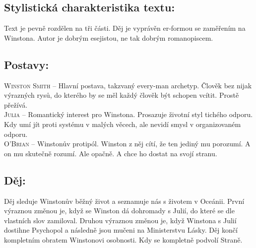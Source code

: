 \documentclass{extarticle} %
\begin{document}




\subsection*{Stylistická charakteristika textu:}
\noindent
Text je pevně rozdělen na tři části. Děj je vyprávěn er-formou se zaměřením na Winstona. Autor je dobrým esejistou, ne tak dobrým romanopiscem.

\subsection*{Postavy:}
\noindent
\textsc{Winston Smith} -- Hlavní postava, takzvaný every-man archetyp. Člověk bez nijak výrazných rysů, do kterého by se měl každý člověk být schopen vcítit. Prostě přežívá.\\
\textsc{Julia} -- Romantický interest pro Winstona. Prosazuje životní styl tichého odporu. Kdy umí jít proti systému v malých věcech, ale nevidí smysl v organizovaném odporu. \\
\textsc{O'Brian} -- Winstonův protipól. Winston z něj cítí, že ten jediný mu porozumí. A on mu skutečně rozumí. Ale opačně. A chce ho dostat na svojí stranu.

\subsection*{Děj:}
{\setlength{\parindent}{5pt}
Děj sleduje Winstonův běžný život a seznamuje nás s životem v Oceánii. První výraznou změnou je, když se Winston dá dohromady s Julií, do které se dle vlastních slov zamiloval. Druhou výraznou změnou je, když Winstona s Julií dostihne Psychopol a následně jsou mučeni na Ministerstvu Lásky. Děj končí kompletním obratem Winstonovi osobnosti. Kdy se kompletně podvolí Straně.
}
\end{document}
